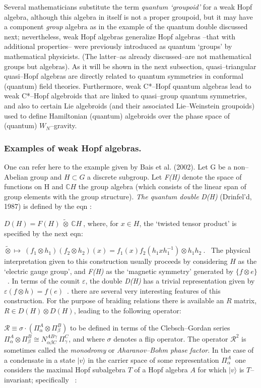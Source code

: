 \documentclass[12pt]{article}
\theoremstyle{plain}
\theoremstyle{definition}
\numberwithin{equation}{section}
\newcommand{\R}{\mathcal R}
\newcommand{\bC}{\mathbb{C}}
\newcommand{\vep}{\varepsilon}
\newcommand{\wti}{\widetilde}
\renewcommand{\a}{\alpha}
\newcommand{\be}{\beta}
\newcommand{\<}{{\langle}}
\begin{document}
  Several mathematicians substitute the term \emph{quantum `groupoid'} for a weak Hopf algebra, although this algebra in
itself is not a proper groupoid, but it may have a component
\emph{group} algebra as in the example of the quantum double
discussed next; nevertheless, weak Hopf algebras generalize Hopf
algebras --that with additional properties-- were previously
introduced as quantum `groups' by mathematical physicists. (The
latter--as already discussed--are not mathematical groups but algebras). 
As it will be shown in the next subsection, quasi--triangular quasi--Hopf algebras are
directly related to quantum symmetries in conformal (quantum)
field theories. Furthermore, weak C*--Hopf quantum algebras lead
to weak C*--Hopf algebroids that are linked to quasi--group
quantum symmetries, and also to certain Lie algebroids (and their
associated Lie--Weinstein groupoids) used to define Hamiltonian
(quantum) algebroids over the phase space of (quantum)
$W_N$--gravity.

\subsubsection{Examples of weak Hopf algebras.}

One can refer here to the example given by Bais et al. (2002). Let G be a non--Abelian group
and $H \subset G$ a discrete subgroup. Let {\em F(H)} denote the space of functions on H 
and $\bC H$ the group algebra (which consists of the linear span of group elements with the group structure).
\emph{The quantum double} \emph{D(H)} (Drinfel'd, 1987) is defined by the eqn :

$D(H) = F(H)~ \wti{\otimes}~ \bC H~$, where, for $x \in H$, the `twisted tensor product' 
is specified by the next eqn: 

$\wti{\otimes} \mapsto ~(f_1 \otimes h_1) (f_2 \otimes h_2)(x) =
f_1(x) f_2(h_1 x h_1^{-1}) \otimes h_1 h_2 ~$.
\
The physical interpretation given to this construction usually proceeds by considering $H$ 
as the `electric gauge group', and {\em F(H)} as the `magnetic symmetry' generated by 
$\{f \otimes e\}$~. In terms of the counit $\vep$, the double {\em D(H)} has a trivial representation 
given by $\vep(f \otimes h) = f(e)$~. there are several very interesting features of this construction.
For the purpose of braiding relations there is available an $R$ matrix, $R \in D(H) \otimes D(H)$, 
leading to the following operator: 

$\mathcal R \equiv \sigma \cdot (\Pi^A_{\a} \otimes \Pi^B_{\be})$ to be defined in terms of the 
Clebsch--Gordan series 
$\Pi^A_{\a} \otimes \Pi^B_{\be} \cong N^{AB \gamma}_{\a \be C}~ \Pi^C_{\gamma}$, and
where $\sigma$ denotes a flip operator. The operator $\R^2$ is sometimes called 
the \emph{monodromy} or \emph{Aharanov--Bohm phase factor}. In the case of a condensate in
a state $\vert v \rangle$ in the carrier space of some representation $\Pi^A_{\a}~$ 
one considers the maximal Hopf subalgebra $T$ of a Hopf algebra $A$ for which $\vert v \rangle$
is $T$--invariant; specifically ~:
\end{document}
